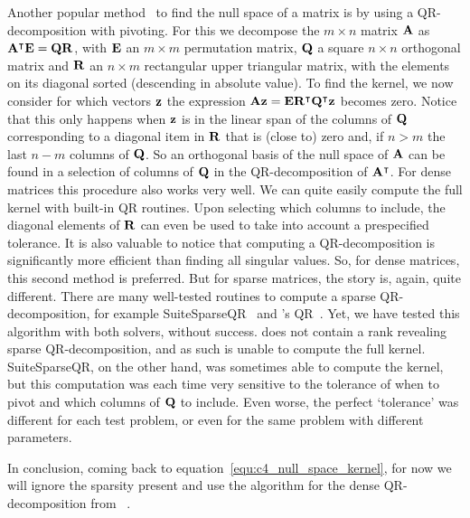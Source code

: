 Another popular method~\cite{trefethen_numerical_1997} to find the null space of a matrix is by using a QR-decomposition with pivoting. For this we decompose the $m \times n$ matrix $\vb{A}$ as ${\vb{A}}^\intercal\vb{E} = \vb{Q} \vb{R}$, with $\vb{E}$ an $m\times m$ permutation matrix, $\vb{Q}$ a square $n \times n$ orthogonal matrix and $\vb{R}$ an $n \times m$ rectangular upper triangular matrix, with the elements on its diagonal sorted (descending in absolute value). To find the kernel, we now consider for which vectors $\vb{z}$ the expression $\vb{A} \vb{z} = \vb{E}{\vb{R}}^\intercal{\vb{Q}}^\intercal\vb{z}$ becomes zero. Notice that this only happens when $\vb{z}$ is in the linear span of the columns of $\vb{Q}$ corresponding to a diagonal item in $\vb{R}$ that is (close to) zero and, if $n > m$ the last $n - m$ columns of $\vb{Q}$. So an orthogonal basis of the null space of $\vb{A}$ can be found in a selection of columns of $\vb{Q}$ in the QR-decomposition of ${\vb{A}}^\intercal$. For dense matrices this procedure also works very well. We can quite easily compute the full kernel with built-in QR routines. Upon selecting which columns to include, the diagonal elements of $\vb{R}$ can even be used to take into account a prespecified tolerance. It is also valuable to notice that computing a QR-decomposition is significantly more efficient than finding all singular values. So, for dense matrices, this second method is preferred. But for sparse matrices, the story is, again, quite different. There are many well-tested routines to compute a sparse QR-decomposition, for example SuiteSparseQR~\cite{davis_algorithm_2011} and \Eigen{}'s QR~\cite{guennebaud_eigen_2010}. Yet, we have tested this algorithm with both solvers, without success. \Eigen{} does not contain a rank revealing sparse QR-decomposition, and as such is unable to compute the full kernel. SuiteSparseQR, on the other hand, was sometimes able to compute the kernel, but this computation was each time very sensitive to the tolerance of when to pivot and which columns of $\vb{Q}$ to include. Even worse, the perfect `tolerance' was different for each test problem, or even for the same problem with different parameters.

In conclusion, coming back to equation~\eqref{equ:c4_null_space_kernel}, for now we will ignore the sparsity present and use the algorithm for the dense QR-decomposition from \Eigen{}~\cite{guennebaud_eigen_2010}.


